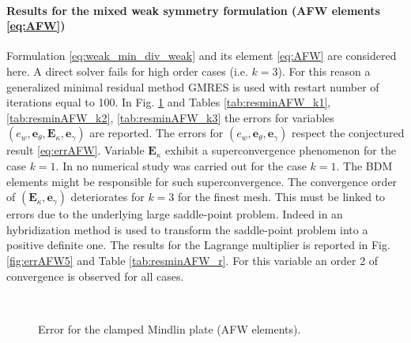 \paragraph{Results for the mixed weak symmetry formulation (AFW elements \eqref{eq:AFW})} 
Formulation \eqref{eq:weak_min_div_weak} and its element \eqref{eq:AFW} are considered here. A direct solver fails for high order cases (i.e. $k=3$). For this reason a generalized minimal residual method GMRES \cite{saad1986gmres} is used with restart number of iterations equal to 100. In Fig. \ref{fig:errorAFW} and Tables \ref{tab:resminAFW_k1}, \ref{tab:resminAFW_k2}, \ref{tab:resminAFW_k3} the errors for variables $(e_w, \bm{e}_\theta, \bm{E}_\kappa, \bm{e}_\gamma)$  are reported. The errors for $(e_w, \bm{e}_\theta, \bm{e}_\gamma)$ respect the conjectured result \eqref{eq:errAFW}. Variable $\bm{E}_\kappa$ exhibit a superconvergence phenomenon for the case $k=1$. In \cite{arnold2014elastodynamics} no numerical study was carried out for the case $k=1$. The BDM elements might be responsible for such superconvergence. The convergence order of $(\bm{E}_\kappa, \bm{e}_\gamma)$ deteriorates for $k=3$ for the finest mesh. This must be linked to errors due to the underlying large saddle-point problem. Indeed in \cite{arnold2014elastodynamics} an hybridization method is used to transform the saddle-point problem into a positive definite one. The results for the Lagrange multiplier is reported in Fig. \ref{fig:errAFW5} and Table \ref{tab:resminAFW_r}. For this variable an order 2 of convergence is observed for all cases.

\begin{figure}[htbp]%
	\centering
	\hspace{8pt}%
	 \\
	\hspace{8pt}%
	\caption{Error for the clamped Mindlin plate (AFW elements).}%
	\label{fig:errorAFW}%
\end{figure}





